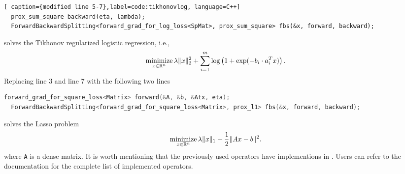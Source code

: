 \begin{lstlisting}[ caption={modified line 5-7},label=code:tikhonovlog, language=C++]
  prox_sum_square backward(eta, lambda);
  ForwardBackwardSplitting<forward_grad_for_log_loss<SpMat>, prox_sum_square> fbs(&x, forward, backward);
\end{lstlisting}
solves the Tikhonov regularized logistic regression, i.e.,
$$\operatorname*{minimize}_{x \in \mathbb{R}^n} \lambda \|x\|_2^2 + \sum_{i = 1}^m \log\left(1 + \exp(-b_i \cdot a_i^T x)\right).$$
Replacing line 3 and line 7 with
the following two lines
\begin{lstlisting}[caption={replaced line 3 and line 7}label=code:tikhonovlog, language=C++]
  forward_grad_for_square_loss<Matrix> forward(&A, &b, &Atx, eta);
  ForwardBackwardSplitting<forward_grad_for_square_loss<Matrix>, prox_l1> fbs(&x, forward, backward);
\end{lstlisting}
solves the Lasso problem
$$\operatorname*{minimize}_{x \in \mathbb{R}^n} \lambda \|x\|_1 + \frac{1}{2}\|A x - b\|^2.$$
where \texttt{A} is a dense matrix. It is worth mentioning that the previously used operators have implementions in \pkg. Users can refer to the documentation for
the complete list of implemented operators.

